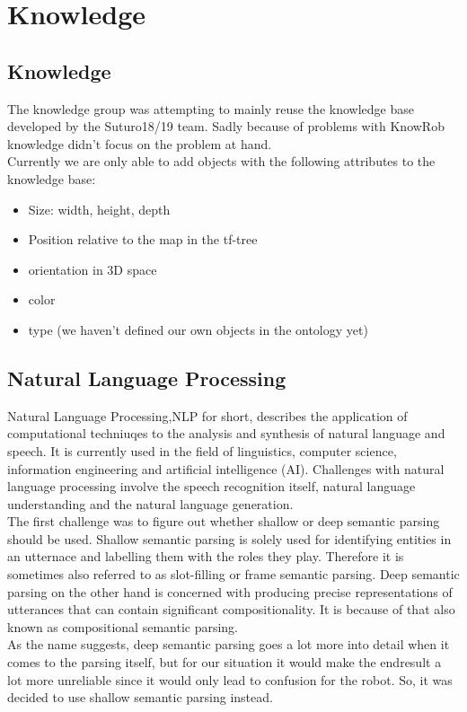 \documentclass[main.tex]{subfiles}
\begin{document}
	
	\chapter{Knowledge}
		\section{Knowledge}
		The knowledge group was attempting to mainly reuse the knowledge base developed by the Suturo18/19 team. Sadly because of problems with KnowRob knowledge didn't focus on the problem at hand.\\
		Currently we are only able to add objects with the following attributes to the knowledge base:\\
		\begin{itemize}
			\item Size: width, height, depth
			\item Position relative to the map in the tf-tree
			\item orientation in 3D space
			\item color
			\item type (we haven't defined our own objects in the ontology yet)
		\end{itemize}
		
		
	
		\section{Natural Language Processing}
		Natural Language Processing,NLP for short, describes the application of computational techniuqes to the analysis and synthesis of natural language and speech. It is currently used in the field of linguistics, computer science, information engineering and artificial intelligence (AI). Challenges with natural language processing involve the speech recognition itself, natural language understanding and the natural language generation.\\
		The first challenge was to figure out whether shallow or deep semantic parsing should be used. Shallow semantic parsing is solely used for identifying entities in an utternace and labelling them with the roles they play. Therefore it is sometimes also referred to as slot-filling or frame semantic parsing. Deep semantic parsing on the other hand is concerned with producing precise representations of utterances that can contain significant compositionality. It is because of that also known as compositional semantic parsing.\\
		As the name suggests, deep semantic parsing goes a lot more into detail when it comes to the parsing itself, but for our situation it would make the endresult a lot more unreliable since it would only lead to confusion for the robot. So, it was decided to use shallow semantic parsing instead.
		
\end{document}
